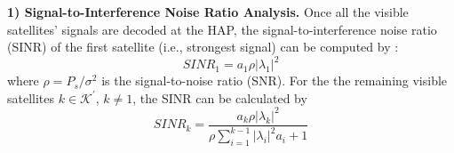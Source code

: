 \documentclass[letter,journal]{IEEEtran}
\newcommand{\red}[1]{\textcolor{red}{[#1]}}
\begin{document}
{\bf 1) Signal-to-Interference Noise Ratio Analysis.} 
Once all the visible satellites' signals are decoded at the HAP, the signal-to-interference noise ratio (SINR) of the first satellite (i.e., strongest signal) can be computed by \cite{aldababsa2018tutorial}:\vspace{-0.1cm}
\begin{equation} \label{eqn_15}
    SINR_{1}= a_1 \rho |\lambda_1|^2
\end{equation}
where $\rho=P_s/\sigma^2$ is the signal-to-noise ratio (SNR). %
For the the remaining visible satellites $k\in\mathcal K^{'}$, $k \neq 1$, the SINR can be calculated by%
\begin{equation}\label{eqn_14}
    SINR_{k}=\frac{a_k \rho |\lambda_{k}|^2}{\rho \sum_{i=1}^{k-1} |\lambda_i|^2 a_i + 1}
\end{equation}
\end{document}
